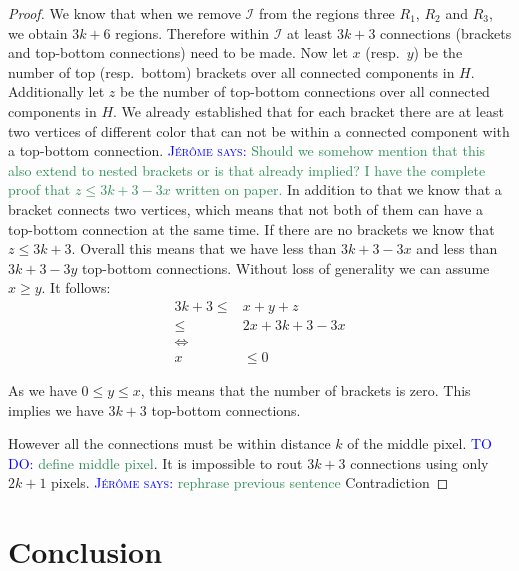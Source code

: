 \documentclass[a4paper,UKenglish,cleveref]{lipics-v2019}
\newcommand{\mremark}[3]{\textcolor{blue}{\textsc{#1 #2:}} \textcolor{SeaGreen}{\textsf{#3}}}
\newcommand{\jerome}[2][says]{\mremark{J\'er\^ome}{#1}{#2}}
\newcommand{\todo}[2][DO]{\mremark{TO}{#1}{#2}}
\newcommand{\ixi}{\mathcal{I}}
\begin{document}
\begin{proof}
We know that when we remove $\ixi$ from the regions three $R_1$, $R_2$ and $R_3$, we obtain $3k+6$ regions. Therefore within $\ixi$ at least $3k+3$ connections (brackets and top-bottom connections) need to be made.
Now let $x$ (resp.\ $y$) be the number of top (resp.\ bottom) brackets over all connected components in $H$. Additionally let $z$ be the number of top-bottom connections over all connected components in $H$.
We already established that for each bracket there are at least two vertices of different color that can not be within a connected component with a top-bottom connection.
\jerome{Should we somehow mention that this also extend to nested brackets or is that already implied? I have the complete proof that $z\leq 3 k +3 -3x$ written on paper.}
In addition to that we know that a bracket connects two vertices, which means that not both of them can have a top-bottom connection at the same time.
If there are no brackets we know that $z\leq 3 k +3$.
Overall this means that we have less than $3k+3 - 3x$ and less than $3k+3 - 3y$ top-bottom connections.
Without loss of generality we can assume $x\geq y$.
It follows:
\begin{align*}
    3k+3\leq& x+y+z\\
    \leq& 2x + 3k+3 - 3x \\
    \iff& \\
    x&\leq 0
\end{align*}

As we have $0\leq y\leq x$, this means that the number of brackets is zero. This implies we have $3k+3$ top-bottom connections.

However all the connections must be within distance $k$ of the middle pixel. \todo{define middle pixel}. It is impossible to rout $3k+3$ connections using only $2k+1$ pixels. \jerome{rephrase previous sentence}
Contradiction

\end{proof}




\section{Conclusion} %
\label{sec:conclusion}
\end{document}
